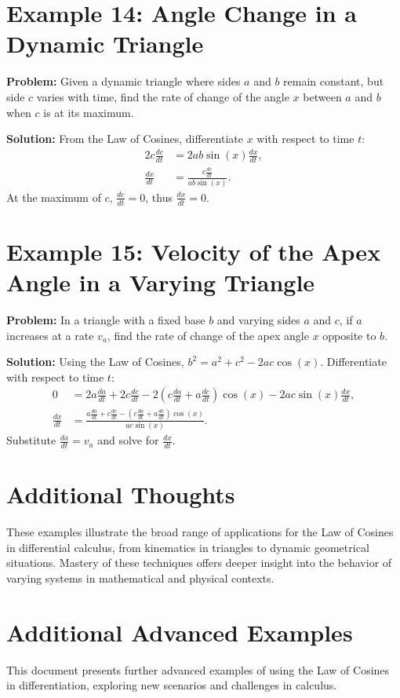 \documentclass[a4paper,12pt]{book}
\newcounter{example}
\begin{document}
\section*{Example 14: Angle Change in a Dynamic Triangle}
\textbf{Problem:} Given a dynamic triangle where sides $a$ and $b$ remain constant, but side $c$ varies with time, find the rate of change of the angle $x$ between $a$ and $b$ when $c$ is at its maximum.

\textbf{Solution:}
From the Law of Cosines, differentiate $x$ with respect to time $t$:
\begin{align*}
2c \frac{dc}{dt} &= 2ab \sin(x) \frac{dx}{dt}, \\
\frac{dx}{dt} &= \frac{c \frac{dc}{dt}}{ab \sin(x)}.
\end{align*}
At the maximum of $c$, $\frac{dc}{dt} = 0$, thus $\frac{dx}{dt} = 0$.

\section*{Example 15: Velocity of the Apex Angle in a Varying Triangle}
\textbf{Problem:} In a triangle with a fixed base $b$ and varying sides $a$ and $c$, if $a$ increases at a rate $v_a$, find the rate of change of the apex angle $x$ opposite to $b$.

\textbf{Solution:}
Using the Law of Cosines, $b^2 = a^2 + c^2 - 2ac \cos(x)$. Differentiate with respect to time $t$:
\begin{align*}
0 &= 2a \frac{da}{dt} + 2c \frac{dc}{dt} - 2 \left( c \frac{da}{dt} + a \frac{dc}{dt} \right) \cos(x) - 2ac \sin(x) \frac{dx}{dt}, \\
\frac{dx}{dt} &= \frac{a \frac{da}{dt} + c \frac{dc}{dt} - \left( c \frac{da}{dt} + a \frac{dc}{dt} \right) \cos(x)}{ac \sin(x)}.
\end{align*}
Substitute $\frac{da}{dt} = v_a$ and solve for $\frac{dx}{dt}$.

\section*{Additional Thoughts}
These examples illustrate the broad range of applications for the Law of Cosines in differential calculus, from kinematics in triangles to dynamic geometrical situations. Mastery of these techniques offers deeper insight into the behavior of varying systems in mathematical and physical contexts.

\section*{Additional Advanced Examples}
This document presents further advanced examples of using the Law of Cosines in differentiation, exploring new scenarios and challenges in calculus.
\end{document}
